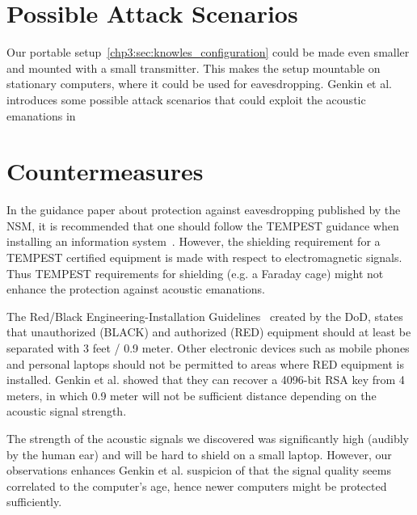 \section{Possible Attack Scenarios}\label{chp6:sec:attack_scenarios}

Our portable setup~\autoref{chp3:sec:knowles_configuration} could be made even smaller and mounted with a small transmitter. 
This makes the setup mountable on stationary computers, where it could be used for eavesdropping. 
Genkin et al. introduces some possible attack scenarios that could exploit the acoustic emanations in ~\cite[Section 1.2 and Appendix B]{DBLP:journals/iacr/GenkinST13}

\section{Countermeasures}\label{chp6:sec:countermeasures}

In the guidance paper about protection against eavesdropping published by the \gls{NSM}, it is recommended that one should follow the TEMPEST guidance when installing an information system~\cite[Section 9.8, page 7]{url:NSM/avlytting}.
However, the shielding requirement for a TEMPEST certified equipment is made with respect to electromagnetic signals.
Thus TEMPEST requirements for shielding (e.g. a Faraday cage) might not enhance the protection against acoustic emanations. 

The Red/Black Engineering-Installation Guidelines~\cite[Section 30.1, page 91]{url:Red/Black/Engineering} created by the \gls{DoD}, states that unauthorized (BLACK) and authorized (RED) equipment should at least be separated with 3 feet / 0.9 meter. 
Other electronic devices such as mobile phones and personal laptops should not be permitted to areas where RED equipment is installed. 
Genkin et al. showed that they can recover a 4096-bit RSA key from 4 meters, in which 0.9 meter will not be sufficient distance depending on the acoustic signal strength. 

The strength of the acoustic signals we discovered was significantly high (audibly by the human ear) and will be hard to shield on a small laptop.
However, our observations enhances Genkin et al. suspicion of that the signal quality seems correlated to the computer's age, hence newer computers might be protected sufficiently. 

